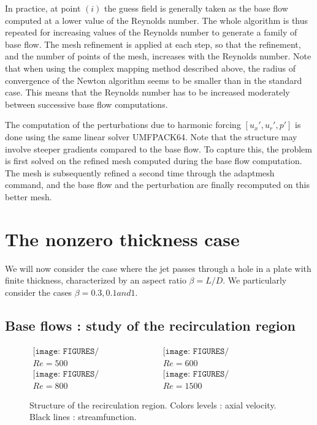 \documentclass{jfm}
\begin{document}
In practice, at point $(i)$ the guess field is generally taken as the base flow computed at a lower value of the Reynolds number. The whole algorithm is thus repeated for increasing values of the Reynolds number to generate a family of base flow. The mesh refinement is applied at each step, so that the refinement, and the number of points of the mesh, increases with the Reynolds number. Note that when using the complex mapping method described above, the radius of convergence of the Newton algorithm seems to be smaller than in the standard case.  This means that the Reynolds number has to be increased moderately between successive base flow computations.

The computation of the perturbations due to harmonic forcing $[u_x',u_r',p']$ is done using the same linear solver UMFPACK64. Note that the structure may involve steeper gradients compared to the base flow. To capture this, the problem is first solved on the refined mesh computed during the base flow computation. The mesh is subsequently refined a second time through the adaptmesh command, and the base flow and the perturbation are finally recomputed on this better mesh. 




\section{The nonzero thickness case}

We will now consider the case where the jet passes through a hole in a plate with finite thickness, characterized by an aspect ratio $\beta = L/D$. We particularly consider the cases $\beta= 0.3, 0.1 and 1$.



\subsection{Base flows : study of the recirculation region}


\begin{figure}
$$
\begin{array}{cc}
\texttt{[image: FIGURES/Recirculation\_Ep03\_Re500.eps]} &
\texttt{[image: FIGURES/Recirculation\_Ep03\_Re600.eps]} \\ 
Re = 500 &  Re = 600 \\
\texttt{[image: FIGURES/Recirculation\_Ep03\_Re800.eps]} &
\texttt{[image: FIGURES/Recirculation\_Ep03\_Re1500.eps]} \\
Re = 800 &  Re = 1500
\end{array}
$$
\caption{ Structure of the recirculation region. Colors levels : axial velocity. Black lines : streamfunction.}
\label{fig:Recirc}
\end{figure}
\end{document}

